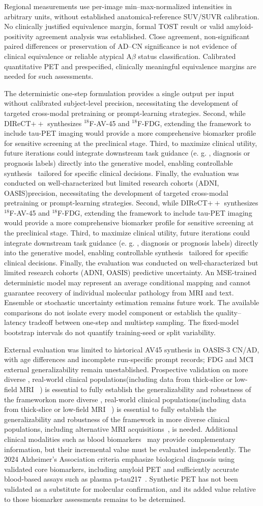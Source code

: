 \documentclass{article}
\providecommand{\DIFaddtex}[1]{{\protect\color{blue} \sf #1}} %
\providecommand{\DIFdeltex}[1]{{\protect\color{red} \ifmmode #1\else\scriptsize #1\fi}} %
\providecommand{\DIFaddbegin}{} %
\providecommand{\DIFaddend}{} %
\providecommand{\DIFdelbegin}{} %
\providecommand{\DIFdelend}{} %
\providecommand{\DIFadd}[1]{\texorpdfstring{\DIFaddtex{#1}}{#1}} %
\providecommand{\DIFdel}[1]{\texorpdfstring{\DIFdeltex{#1}}{}} %
\newcommand{\DIFscaledelfig}{0.5}
\newlength{\DIFdelgraphicswidth} %
\newlength{\DIFdelgraphicsheight} %
\newcommand{\DIFaddincludegraphics}[2][]{{\color{blue}\fbox{\DIFOincludegraphics[#1]{#2}}}} %
\newcommand{\DIFdelincludegraphics}[2][]{%
\sbox{\DIFdelgraphicsbox}{\DIFOincludegraphics[#1]{#2}}%
\settoboxwidth{\DIFdelgraphicswidth}{\DIFdelgraphicsbox} %
\settoboxtotalheight{\DIFdelgraphicsheight}{\DIFdelgraphicsbox} %
\scalebox{\DIFscaledelfig}{%
\parbox[b]{\DIFdelgraphicswidth}{\usebox{\DIFdelgraphicsbox}\\[-\baselineskip] \rule{\DIFdelgraphicswidth}{0em}}\llap{\resizebox{\DIFdelgraphicswidth}{\DIFdelgraphicsheight}{%
\setlength{\unitlength}{\DIFdelgraphicswidth}%
\begin{picture}(1,1)%
\thicklines\linethickness{2pt} %
{\color[rgb]{1,0,0}\put(0,0){\framebox(1,1){}}}%
{\color[rgb]{1,0,0}\put(0,0){\line( 1,1){1}}}%
{\color[rgb]{1,0,0}\put(0,1){\line(1,-1){1}}}%
\end{picture}%
}\hspace*{3pt}}} %
} %
\DeclareRobustCommand{\DIFaddbegin}{\DIFOaddbegin \let\includegraphics\DIFaddincludegraphics} %
\DeclareRobustCommand{\DIFaddend}{\DIFOaddend \let\includegraphics\DIFOincludegraphics} %
\DeclareRobustCommand{\DIFdelbegin}{\DIFOdelbegin \let\includegraphics\DIFdelincludegraphics} %
\DeclareRobustCommand{\DIFdelend}{\DIFOaddend \let\includegraphics\DIFOincludegraphics} %
\begin{document}
\DIFadd{Regional measurements use per-image min--max-normalized intensities in arbitrary units, without established anatomical-reference SUV/SUVR calibration. No clinically justified equivalence margin, formal TOST result or valid amyloid-positivity agreement analysis was established. Close agreement, non-significant paired differences or preservation of AD--CN significance is not evidence of clinical equivalence or reliable atypical A$\beta$ status classification. Calibrated quantitative PET and prespecified, clinically meaningful equivalence margins are needed for such assessments.
}

\DIFadd{The deterministic one-step formulation provides a single output per input without calibrated }\DIFaddend subject-level \DIFdelbegin \DIFdel{precision, necessitating the development of targeted cross-modal pretraining or prompt-learning strategies. Second, while DIReCT$++$ synthesizes $^{18}$F-AV-45 and $^{18}$F-FDG, extending the framework to include tau-PET imaging would provide a more comprehensive biomarker profile for sensitive screening at the preclinical stage.
Third, to maximize clinical utility, future iterations could integrate downstream task guidance (e. g. , diagnosis or prognosis labels) directly into the generative model, enabling controllable synthesis~\cite{wang2025flexibly,chang2025controllable} tailored for specific clinical decisions. Finally, the evaluation was conducted on well-characterized but limited research cohorts (ADNI, OASIS)}\DIFdelend \DIFaddbegin \DIFadd{predictive uncertainty. An MSE-trained deterministic model may represent an average conditional mapping and cannot guarantee recovery of individual molecular pathology from MRI and text. Ensemble or stochastic uncertainty estimation remains future work. The available comparisons do not isolate every model component or establish the quality--latency tradeoff between one-step and multistep sampling. The fixed-model bootstrap intervals do not quantify training-seed or split variability.
}

\DIFadd{External evaluation was limited to historical AV45 synthesis in OASIS-3 CN/AD, with age differences and incomplete run-specific prompt records; FDG and MCI external generalizability remain unestablished}\DIFaddend . Prospective validation \DIFdelbegin \DIFdel{on more diverse , real-world clinical populations(including data from thick-slice or low-field MRI ~\cite{sorby2024portable}) is essential to fully establish the generalizability and robustness of the framework}\DIFdelend \DIFaddbegin \DIFadd{in more diverse clinical populations, including alternative MRI acquisitions~\cite{sorby2024portable}, is needed. Additional clinical modalities such as blood biomarkers~\cite{hansson2023blood} may provide complementary information, but their incremental value must be evaluated independently. The 2024 Alzheimer's Association criteria emphasize biological diagnosis using validated core biomarkers, including amyloid PET and sufficiently accurate blood-based assays such as plasma p-tau217~\cite{jack2024revised}. Synthetic PET has not been validated as a substitute for molecular confirmation, and its added value relative to those biomarker assessments remains to be determined}\DIFaddend .
\end{document}

